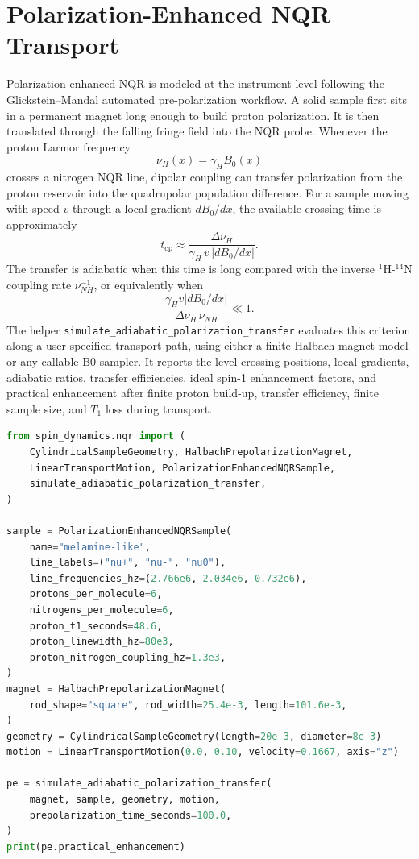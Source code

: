 \documentclass[11pt,oneside]{report}
\newcommand{\code}[1]{\texttt{#1}}
\begin{document}
\section{Polarization-Enhanced NQR Transport}
\label{sec:nqr-polarization-enhancement}

Polarization-enhanced NQR is modeled at the instrument level following the
Glickstein--Mandal automated pre-polarization workflow. A solid sample first
sits in a permanent magnet long enough to build proton polarization. It is then
translated through the falling fringe field into the NQR probe. Whenever the
proton Larmor frequency
\[
  \nu_H(x) = \gamma_H B_0(x)
\]
crosses a nitrogen NQR line, dipolar coupling can transfer polarization from
the proton reservoir into the quadrupolar population difference. For a sample
moving with speed \(v\) through a local gradient \(dB_0/dx\), the available
crossing time is approximately
\[
  t_{\mathrm{cp}} \approx
  \frac{\Delta\nu_H}{\gamma_H\,v\,|dB_0/dx|}.
\]
The transfer is adiabatic when this time is long compared with the inverse
\({}^{1}\mathrm{H}\)-\({}^{14}\mathrm{N}\) coupling rate \(\nu_{NH}^{-1}\), or
equivalently when
\[
  \frac{\gamma_H v |dB_0/dx|}
       {\Delta\nu_H\,\nu_{NH}} \ll 1.
\]
The helper \code{simulate\_adiabatic\_polarization\_transfer} evaluates this
criterion along a user-specified transport path, using either a finite Halbach
magnet model or any callable B0 sampler. It reports the level-crossing
positions, local gradients, adiabatic ratios, transfer efficiencies, ideal
spin-1 enhancement factors, and practical enhancement after finite proton
build-up, transfer efficiency, finite sample size, and \(T_1\) loss during
transport.

\begin{lstlisting}[language=Python]
from spin_dynamics.nqr import (
    CylindricalSampleGeometry, HalbachPrepolarizationMagnet,
    LinearTransportMotion, PolarizationEnhancedNQRSample,
    simulate_adiabatic_polarization_transfer,
)

sample = PolarizationEnhancedNQRSample(
    name="melamine-like",
    line_labels=("nu+", "nu-", "nu0"),
    line_frequencies_hz=(2.766e6, 2.034e6, 0.732e6),
    protons_per_molecule=6,
    nitrogens_per_molecule=6,
    proton_t1_seconds=48.6,
    proton_linewidth_hz=80e3,
    proton_nitrogen_coupling_hz=1.3e3,
)
magnet = HalbachPrepolarizationMagnet(
    rod_shape="square", rod_width=25.4e-3, length=101.6e-3,
)
geometry = CylindricalSampleGeometry(length=20e-3, diameter=8e-3)
motion = LinearTransportMotion(0.0, 0.10, velocity=0.1667, axis="z")

pe = simulate_adiabatic_polarization_transfer(
    magnet, sample, geometry, motion,
    prepolarization_time_seconds=100.0,
)
print(pe.practical_enhancement)
\end{lstlisting}
\end{document}
